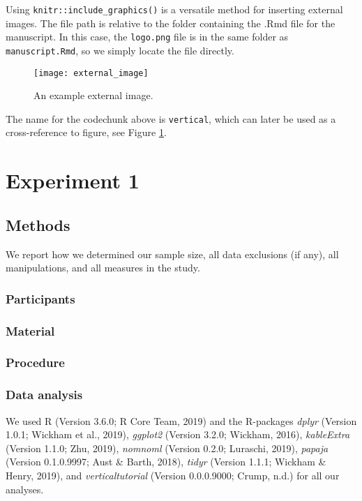 \documentclass[
  english,
  man,floatsintext]{apa6}
\begin{document}
Using \texttt{knitr::include\_graphics()} is a versatile method for inserting external images. The file path is relative to the folder containing the .Rmd file for the manuscript. In this case, the \texttt{logo.png} file is in the same folder as \texttt{manuscript.Rmd}, so we simply locate the file directly.

\begin{figure}
\texttt{[image: external\_image]} \caption{An example external image.}\label{fig:vertical}
\end{figure}

The name for the codechunk above is \texttt{vertical}, which can later be used as a cross-reference to figure, see Figure \ref{fig:vertical}.

\hypertarget{experiment-1}{%
\section{Experiment 1}\label{experiment-1}}

\hypertarget{methods}{%
\subsection{Methods}\label{methods}}

We report how we determined our sample size, all data exclusions (if any), all manipulations, and all measures in the study.

\hypertarget{participants}{%
\subsubsection{Participants}\label{participants}}

\hypertarget{material}{%
\subsubsection{Material}\label{material}}

\hypertarget{procedure}{%
\subsubsection{Procedure}\label{procedure}}

\hypertarget{data-analysis}{%
\subsubsection{Data analysis}\label{data-analysis}}

We used R (Version 3.6.0; R Core Team, 2019) and the R-packages \emph{dplyr} (Version 1.0.1; Wickham et al., 2019), \emph{ggplot2} (Version 3.2.0; Wickham, 2016), \emph{kableExtra} (Version 1.1.0; Zhu, 2019), \emph{nomnoml} (Version 0.2.0; Luraschi, 2019), \emph{papaja} (Version 0.1.0.9997; Aust \& Barth, 2018), \emph{tidyr} (Version 1.1.1; Wickham \& Henry, 2019), and \emph{verticaltutorial} (Version 0.0.0.9000; Crump, n.d.) for all our analyses.
\end{document}
